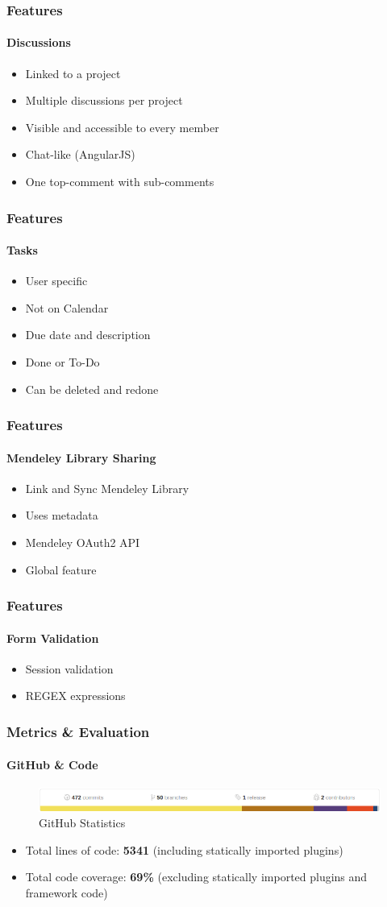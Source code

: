 \documentclass{beamer}
\begin{document}
\begin{frame}
\frametitle{Features}
\framesubtitle{Discussions}
	\begin{itemize}
		\item Linked to a project
		\item Multiple discussions per project
		\item Visible and accessible to every member
		\item Chat-like (AngularJS)
		\item One top-comment with sub-comments
	\end{itemize}
\end{frame}

\begin{frame}
\frametitle{Features}
\framesubtitle{Tasks}
	\begin{itemize}
		\item User specific
		\item Not on Calendar
		\item Due date and description
		\item Done or To-Do
		\item Can be deleted and redone
	\end{itemize}
\end{frame}

\begin{frame}
\frametitle{Features}
\framesubtitle{Mendeley Library Sharing}
	\begin{itemize}
		\item Link and Sync Mendeley Library
		\item Uses metadata
		\item Mendeley OAuth2 API
		\item Global feature
	\end{itemize}
\end{frame}

\begin{frame}
\frametitle{Features}
\framesubtitle{Form Validation}
	\begin{itemize}
		\item Session validation
		\item REGEX expressions
	\end{itemize}
\end{frame}

\begin{frame}
\frametitle{Metrics \& Evaluation}
\framesubtitle{GitHub \& Code}
	\begin{figure}
		\includegraphics[scale=0.3]{./images/github_stats.png}
		\caption{GitHub Statistics}
	\end{figure}
	\begin{itemize}
		\item Total lines of code: \textbf{5341} (including statically imported plugins)
		\item Total code coverage: \textbf{69\%} (excluding statically imported plugins and framework code)
	\end{itemize}
\end{frame}
\end{document}
